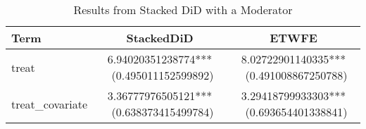 \begin{table}[ht]
\centering
\caption{Results from Stacked DiD with a Moderator} 
\label{tab:stacked_cov}
\begin{tabular}{lcc}
  \toprule
Term & StackedDiD & ETWFE \\ 
  \midrule
treat & 6.94020351238774*** \
(0.495011152599892) & 8.02722901140335*** \
(0.491008867250788) \\ 
  treat_covariate & 3.36777976505121*** \
(0.638373415499784) & 3.29418799933303*** \
(0.693654401338841) \\ 
   \bottomrule
\end{tabular}
\end{table}
